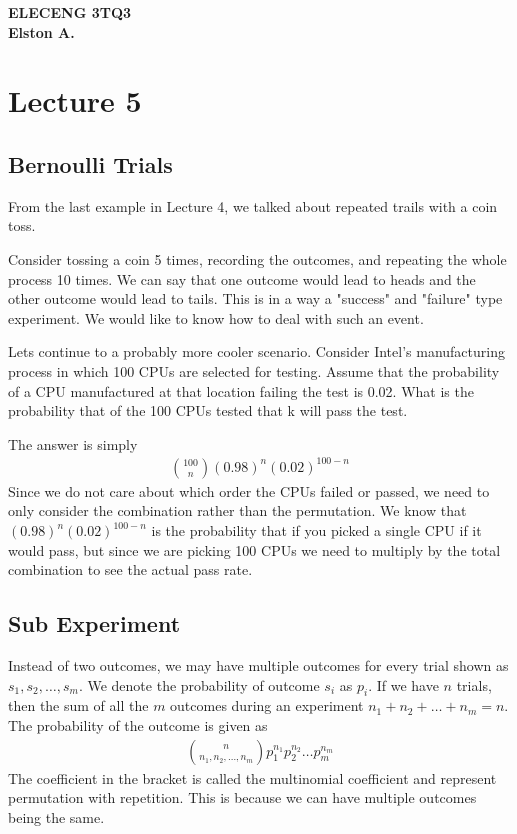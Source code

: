 \documentclass[12pt, titlepage, oneside]{article}
\begin{document}
	
	\textbf{ELECENG 3TQ3}\\
	\textbf{Elston A.}
	
\section{Lecture 5}

\subsection{Bernoulli Trials}

From the last example in Lecture 4, we talked about repeated trails with a coin toss. 

Consider tossing a coin 5 times, recording the outcomes, and repeating the whole process 10 times. We can say that one outcome would lead to heads and the other outcome would lead to tails. This is in a way a "success" and "failure" type experiment. We would like to know how to deal with such an event.

Lets continue to a probably more cooler scenario. Consider Intel's manufacturing process in which 100 CPUs are selected for testing.
Assume that the probability of a CPU manufactured at that location failing the test is 0.02. What is the probability that of the 100 CPUs tested that k will pass the test.

The answer is simply
\begin{align}
{100\choose n} (0.98)^n (0.02)^{100-n}
\end{align}
Since we do not care about which order the CPUs failed or passed, we need to only consider the combination rather than the permutation. We know that $(0.98)^n(0.02)^{100-n}$ is the probability that if you picked a single CPU if it would pass, but since we are picking 100 CPUs we need to multiply by the total combination to see the actual pass rate. 

\subsection{Sub Experiment}

Instead of two outcomes, we may have multiple outcomes for every trial shown as $s_1,s_2,\dots,s_m$. We denote the probability of outcome $s_i$ as $p_i$. If we have $n$ trials, then the sum of all the $m$ outcomes during an experiment $n_1 + n_2 + \dots + n_m = n$. The probability of the outcome is given as
\begin{align}
{n \choose n_1,n_2,\dots,n_m} p_1^{n_1} p_2^{n_2} \dots p_m^{n_m}
\end{align}
The coefficient in the bracket is called the multinomial coefficient and represent permutation with repetition. This is because we can have multiple outcomes being the same.
\end{document}
